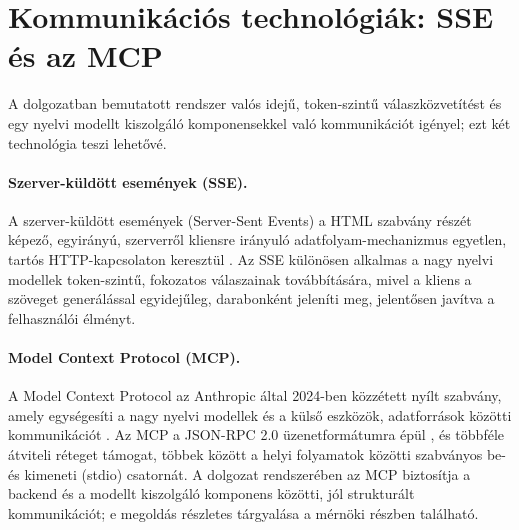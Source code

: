 \section{Kommunikációs technológiák: SSE és az MCP}

A dolgozatban bemutatott rendszer valós idejű, token-szintű válaszközvetítést és
egy nyelvi modellt kiszolgáló komponensekkel való kommunikációt igényel; ezt két
technológia teszi lehetővé.

\paragraph{Szerver-küldött események (SSE).} A szerver-küldött események
(Server-Sent Events) a HTML szabvány részét képező, egyirányú, szerverről
kliensre irányuló adatfolyam-mechanizmus egyetlen, tartós HTTP-kapcsolaton
keresztül \cite{whatwg_sse}. Az SSE különösen alkalmas a nagy nyelvi modellek
token-szintű, fokozatos válaszainak továbbítására, mivel a kliens a szöveget
generálással egyidejűleg, darabonként jeleníti meg, jelentősen javítva a
felhasználói élményt.

\paragraph{Model Context Protocol (MCP).} A Model Context Protocol az Anthropic
által 2024-ben közzétett nyílt szabvány, amely egységesíti a nagy nyelvi
modellek és a külső eszközök, adatforrások közötti kommunikációt \cite{mcp2024}.
Az MCP a JSON-RPC 2.0 üzenetformátumra épül \cite{jsonrpc2013}, és többféle
átviteli réteget támogat, többek között a helyi folyamatok közötti szabványos
be- és kimeneti (stdio) csatornát. A dolgozat rendszerében az MCP biztosítja a
backend és a modellt kiszolgáló komponens közötti, jól strukturált
kommunikációt; e megoldás részletes tárgyalása a mérnöki részben található.
